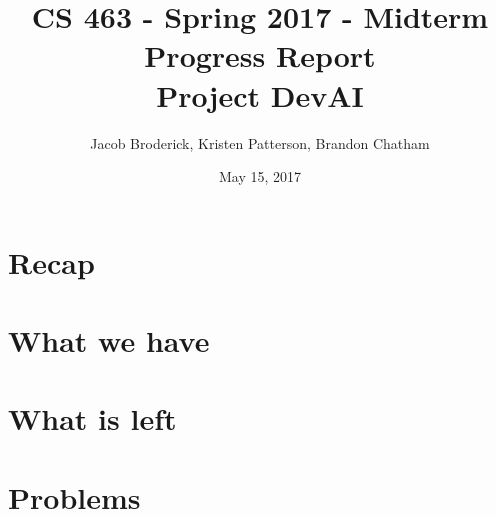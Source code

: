 \documentclass[10pt,letterpaper,onecolumn,draftclsnofoot]{IEEEtran}
\begin{document}
	
	\begin{titlepage}
		
		\title{CS 463 - Spring 2017 - Midterm Progress Report \\ Project DevAI}
		\author{Jacob Broderick, Kristen Patterson, Brandon Chatham}
		\date{May 15, 2017}
		\maketitle
		\vspace{4cm}
	\end{titlepage}

\section{Recap}

\section{What we have}

\section{What is left}

\section{Problems}
\end{document}
